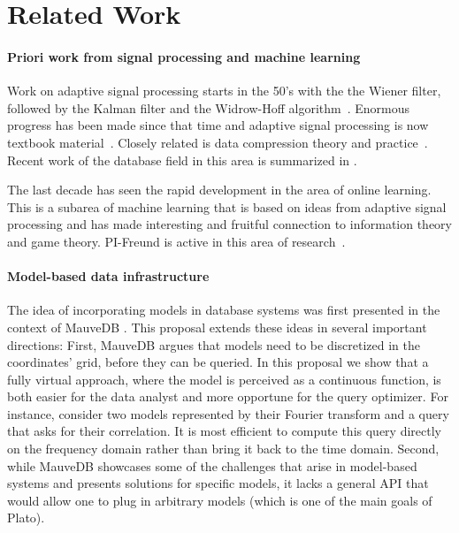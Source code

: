 \section{Related Work}

\paragraph{Priori work from signal processing and machine learning}
Work on adaptive signal processing starts in the 50's with the
the Wiener filter, followed by the Kalman filter and the Widrow-Hoff
algorithm~\cite{adaptive_signal_processing}. Enormous progress has
been made since that time and adaptive signal processing is now
textbook material~\cite{dsp,adaptive_filter_theory}. Closely related
is data compression theory and practice~\cite{DBLP:books/mk/Sayood12}.
Recent work of the database field in this area is summarized in \cite{DBS-005}.

The last decade has seen the rapid development in the area of online
learning. This is a subarea of machine learning that is based on ideas
from adaptive signal processing and has made interesting and fruitful
connection to information theory and game theory. PI-Freund is active
in this area of research~\cite{prediction_learning_models}.

\paragraph{Model-based data infrastructure}
The idea of incorporating models in database systems was first presented in the context of MauveDB \cite{mauvedb-grid, mauvedb-cidr, mauvedb-vldb}. This proposal extends these ideas in several important directions: First, MauveDB argues that models need to be discretized in the coordinates' grid, before they can be queried. In this proposal we show that a fully virtual approach, where the model is perceived as a continuous function, is both easier for the data analyst and more opportune for the query optimizer. For instance, consider two models represented by their Fourier transform and a query that asks for their correlation. It is most efficient to compute this query directly on the frequency domain rather than bring it back to the time domain. Second, while MauveDB showcases some of the challenges that arise in model-based systems and presents solutions for specific models, it lacks a general API that would allow one to plug in arbitrary models (which is one of the main goals of Plato). 

